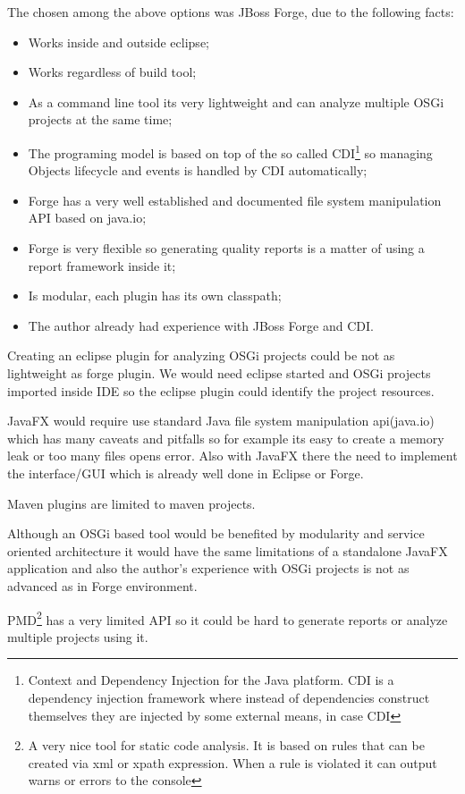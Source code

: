 The chosen among the above options was JBoss Forge, due to the following facts:

\begin{itemize}
\item Works inside and outside eclipse;
\item Works regardless of build tool;
\item As a command line tool its very lightweight and can analyze multiple OSGi projects at the same time;
\item The programing model is based on top of the so called CDI\footnote{Context and Dependency Injection for the Java platform. CDI is a dependency injection framework where instead of dependencies construct themselves they are injected by some external means, in case CDI} so managing Objects lifecycle and events is handled by CDI automatically;
\item Forge has a very well established and documented file system manipulation API based on java.io;
\item Forge is very flexible so generating quality reports is a matter of using a report framework inside it;  
\item Is modular, each plugin has its own classpath;
\item The author already had experience with JBoss Forge and CDI. 
\end{itemize}

Creating an eclipse plugin for analyzing OSGi projects could be not as lightweight as forge plugin. We would need eclipse started and OSGi projects imported inside IDE so the eclipse plugin could identify the project resources.

JavaFX would require use standard Java file system manipulation api(java.io) which has many caveats and pitfalls so for example its easy to create a memory leak or too many files opens error. Also with JavaFX there the need to implement the interface/GUI which is already well done in Eclipse or Forge.

Maven plugins are limited to maven projects.

Although an OSGi based tool would be benefited by modularity and service oriented architecture it would have the same limitations of a standalone JavaFX application and also the author's experience with OSGi projects is not as advanced as in Forge environment. 

PMD\footnote{A very nice tool for static code analysis. It is based on rules that can be created via xml or xpath expression. When a rule is violated it can output warns or errors to the console} has a very limited API so it could be hard to generate reports or analyze multiple projects using it. 

